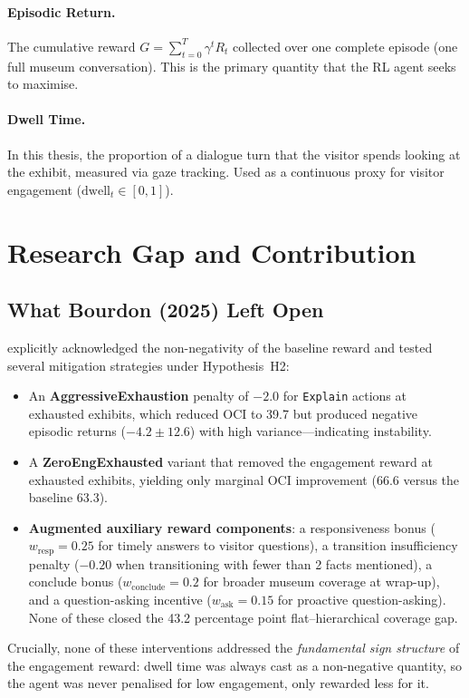 \documentclass[12pt,a4paper]{article}
\begin{document}
\paragraph{Episodic Return.}
The cumulative reward $G = \sum_{t=0}^{T} \gamma^t R_t$ collected over one complete episode (one full museum conversation). This is the primary quantity that the RL agent seeks to maximise.

\paragraph{Dwell Time.}
In this thesis, the proportion of a dialogue turn that the visitor spends looking at the exhibit, measured via gaze tracking. Used as a continuous proxy for visitor engagement ($\mathrm{dwell}_t \in [0, 1]$).

\section{Research Gap and Contribution}
\label{sec:gap}

\subsection{What Bourdon (2025) Left Open}

\citet{bourdon2025} explicitly acknowledged the non-negativity of the baseline reward and tested several mitigation strategies under Hypothesis~H2:
\begin{itemize}[nosep]
    \item An \textbf{AggressiveExhaustion} penalty of $-2.0$ for \texttt{Explain} actions at exhausted exhibits, which reduced OCI to 39.7 but produced negative episodic returns ($-4.2 \pm 12.6$) with high variance---indicating instability.
    \item A \textbf{ZeroEngExhausted} variant that removed the engagement reward at exhausted exhibits, yielding only marginal OCI improvement (66.6 versus the baseline 63.3).
    \item \textbf{Augmented auxiliary reward components}: a responsiveness bonus ($w_{\mathrm{resp}} = 0.25$ for timely answers to visitor questions), a transition insufficiency penalty ($-0.20$ when transitioning with fewer than 2 facts mentioned), a conclude bonus ($w_{\mathrm{conclude}} = 0.2$ for broader museum coverage at wrap-up), and a question-asking incentive ($w_{\mathrm{ask}} = 0.15$ for proactive question-asking). None of these closed the 43.2 percentage point flat--hierarchical coverage gap.
\end{itemize}
Crucially, none of these interventions addressed the \emph{fundamental sign structure} of the engagement reward: dwell time was always cast as a non-negative quantity, so the agent was never penalised for low engagement, only rewarded less for it.
\end{document}
